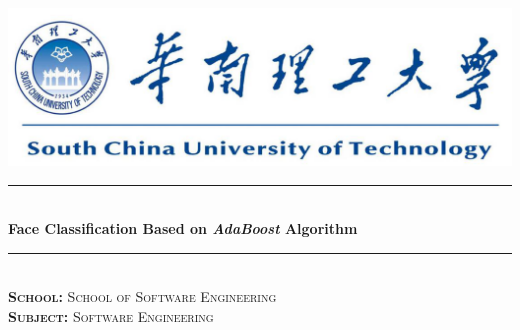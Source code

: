 \documentclass[journal, a4paper]{IEEEtran}
\begin{document}
\begin{titlepage}

\newcommand{\HRule}{\rule{\linewidth}{0.5mm}} %

\center %

~\\[1cm]
\includegraphics{SCUT.png}\\[2cm] %


\HRule \\[1cm]
{ \huge \bfseries Face Classification Based on \textit{AdaBoost} Algorithm}\\[0.6cm] %
\HRule \\[2cm]


\textsc{\LARGE \textbf{School:} School of Software Engineering}\\[1cm]
\textsc{\LARGE \textbf{Subject:} Software Engineering}\\[2cm] 

 


\end{titlepage}
\end{document}
